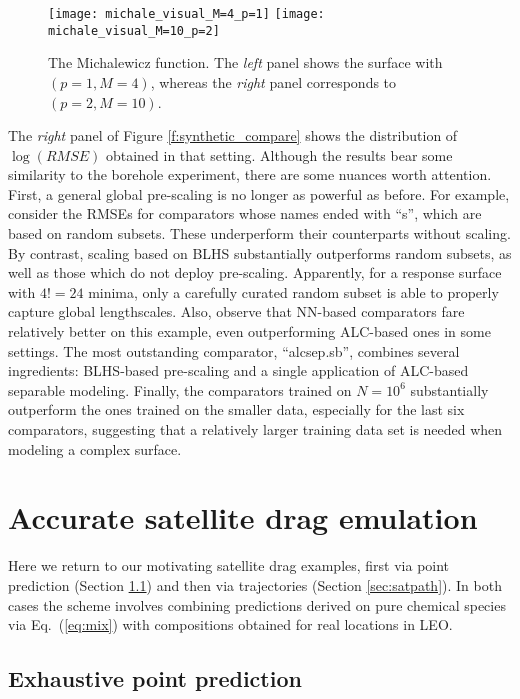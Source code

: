 \documentclass[12pt]{article}
\begin{document}
\begin{figure}[ht!]
\centering
\texttt{[image: michale\_visual\_M=4\_p=1]} \hspace{1cm}
\texttt{[image: michale\_visual\_M=10\_p=2]}
\caption{The Michalewicz function. The {\em left} panel shows the surface with $(p=1, M=4)$, whereas
the {\em right} panel corresponds to $(p=2, M=10)$.}
\label{f:michale_visual}
\end{figure}	

The {\em right} panel of Figure \ref{f:synthetic_compare} shows the
distribution of $\log(RMSE)$ obtained in that setting. Although the results bear
some similarity to the borehole experiment, there are some nuances worth
attention. First, a general global pre-scaling is no longer as powerful as
before.  For example, consider the RMSEs for comparators whose names ended
with ``s'', which are based on random subsets.  These underperform their
counterparts without scaling.  By contrast, scaling based on BLHS
substantially outperforms random subsets, as well as those which do not deploy
pre-scaling. Apparently, for a response surface with $4!=24$ minima, only a
carefully curated random subset is able to properly capture global
lengthscales. Also, observe that NN-based comparators fare relatively better
on this example, even outperforming ALC-based ones in some settings.  The most
outstanding comparator, ``alcsep.sb'', combines several ingredients:
BLHS-based pre-scaling and a single application of ALC-based separable
modeling. Finally, the comparators trained on $N=10^6$ substantially
outperform the ones trained on the smaller data, especially for the last six
comparators, suggesting that a relatively larger training data set is needed when
modeling a complex surface.

\section{Accurate satellite drag emulation}
\label{sec:satemu}

Here we return to our motivating satellite drag examples, first via point
prediction (Section \ref{sec:epp}) and then via trajectories (Section
\ref{sec:satpath}).  In both cases the scheme involves combining predictions
derived on pure chemical species via Eq.~(\ref{eq:mix}) with compositions
obtained for real locations in LEO.

\subsection{Exhaustive point prediction}
\label{sec:epp}
\end{document}
